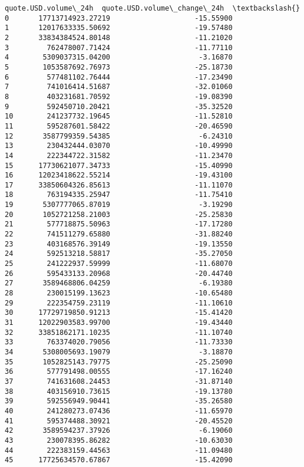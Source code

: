 \documentclass[11pt]{article}
\begin{document}
\begin{tcolorbox}[breakable, size=fbox, boxrule=.5pt, pad at break*=1mm, opacityfill=0]
\begin{Verbatim}[commandchars=\\\{\}]
     quote.USD.volume\_24h  quote.USD.volume\_change\_24h  \textbackslash{}
0       17713714923.27219                    -15.55900
1       12017633335.50692                    -19.57480
2       33834384524.80148                    -11.21020
3         762478007.71424                    -11.77110
4        5309037315.04200                     -3.16870
5        1053587692.76973                    -25.18730
6         577481102.76444                    -17.23490
7         741016414.51687                    -32.01060
8         403231681.70592                    -19.08390
9         592450710.20421                    -35.32520
10        241237732.19645                    -11.52810
11        595287601.58422                    -20.46590
12       3587799359.54385                     -6.24310
13        230432444.03070                    -10.49990
14        222344722.31582                    -11.23470
15      17730621077.34733                    -15.40990
16      12023418622.55214                    -19.43100
17      33850604326.85613                    -11.11070
18        763194335.25947                    -11.75410
19       5307777065.87019                     -3.19290
20       1052721258.21003                    -25.25830
21        577718875.50963                    -17.17280
22        741511279.65880                    -31.88240
23        403168576.39149                    -19.13550
24        592513218.58817                    -35.27050
25        241222937.59999                    -11.68070
26        595433133.20968                    -20.44740
27       3589468806.04259                     -6.19380
28        230015199.13623                    -10.65480
29        222354759.23119                    -11.10610
30      17729719850.91213                    -15.41420
31      12022903583.99700                    -19.43440
32      33851862171.10235                    -11.10740
33        763374020.79056                    -11.73330
34       5308005693.19079                     -3.18870
35       1052825143.79775                    -25.25090
36        577791498.00555                    -17.16240
37        741631608.24453                    -31.87140
38        403156910.73615                    -19.13780
39        592556949.90441                    -35.26580
40        241280273.07436                    -11.65970
41        595374488.30921                    -20.45520
42       3589594237.37926                     -6.19060
43        230078395.86282                    -10.63030
44        222383159.44563                    -11.09480
45      17725634570.67867                    -15.42090

\end{Verbatim}
\end{tcolorbox}
\end{document}
